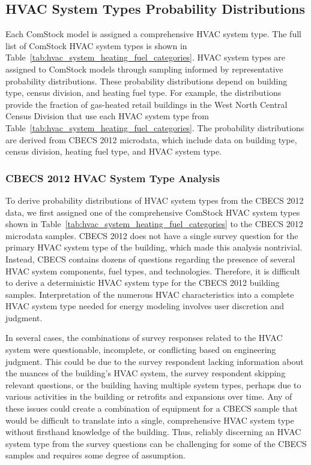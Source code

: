 
\vspace{5mm}
\subsection{HVAC System Types Probability Distributions}
\label{sec:HVAC_System_Type}

Each ComStock model is assigned a comprehensive HVAC system type. The full list of ComStock HVAC system types is shown in Table~\ref{tab:hvac_system_heating_fuel_categories}. HVAC system types are assigned to ComStock models through sampling informed by representative probability distributions. These probability distributions depend on building type, census division, and heating fuel type. For example, the distributions provide the fraction of gas-heated retail buildings in the West North Central Census Division that use each HVAC system type from Table~\ref{tab:hvac_system_heating_fuel_categories}. The probability distributions are derived from CBECS 2012 microdata, which include data on building type, census division, heating fuel type, and HVAC system type.



\subsubsection{CBECS 2012 HVAC System Type Analysis}

To derive probability distributions of HVAC system types from the CBECS 2012 data, we first assigned one of the comprehensive ComStock HVAC system types shown in Table~\ref{tab:hvac_system_heating_fuel_categories} to the CBECS 2012 microdata samples. CBECS 2012 does not have a single survey question for the primary HVAC system type of the building, which made this analysis nontrivial. Instead, CBECS contains dozens of questions regarding the presence of several HVAC system components, fuel types, and technologies. Therefore, it is difficult to derive a deterministic HVAC system type for the CBECS 2012 building samples. Interpretation of the numerous HVAC characteristics into a complete HVAC system type needed for energy modeling involves user discretion and judgment.

In several cases, the combinations of survey responses related to the HVAC system were questionable, incomplete, or conflicting based on engineering judgment. This could be due to the survey respondent lacking information about the nuances of the building's HVAC system, the survey respondent skipping relevant questions, or the building having multiple system types, perhaps due to various activities in the building or retrofits and expansions over time. Any of these issues could create a combination of equipment for a CBECS sample that would be difficult to translate into a single, comprehensive HVAC system type without firsthand knowledge of the building. Thus, reliably discerning an HVAC system type from the survey questions can be challenging for some of the CBECS samples and requires some degree of assumption.

